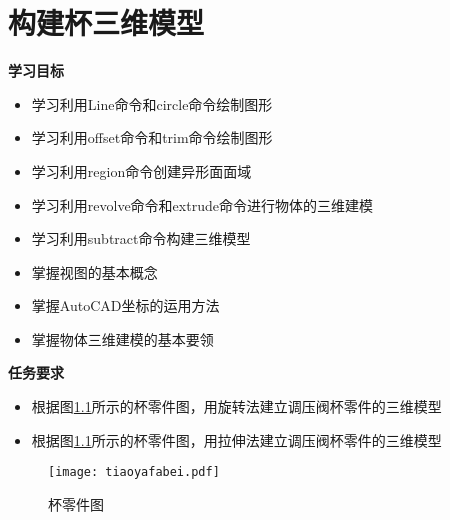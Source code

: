 \chapter{构建杯三维模型}\label{chap:bei}

{\bfseries 学习目标}
\begin{itemize}
\item 学习利用Line命令和circle命令绘制图形
\item 学习利用offset命令和trim命令绘制图形
\item 学习利用region命令创建异形面面域
\item 学习利用revolve命令和extrude命令进行物体的三维建模
\item 学习利用subtract命令构建三维模型
\item 掌握视图的基本概念
\item 掌握AutoCAD坐标的运用方法
\item 掌握物体三维建模的基本要领
\end{itemize}

{\bfseries 任务要求}
\begin{itemize}
\item 根据图\ref{fig:tiaoyafabei}所示的杯零件图，用旋转法建立调压阀杯零件的三维模型
\item 根据图\ref{fig:tiaoyafabei}所示的杯零件图，用拉伸法建立调压阀杯零件的三维模型
\end{itemize}

\begin{figure}[htbp]
\centering
\texttt{[image: tiaoyafabei.pdf]}
\caption{杯零件图}\label{fig:tiaoyafabei}
\end{figure}
\clearpage







\endinput